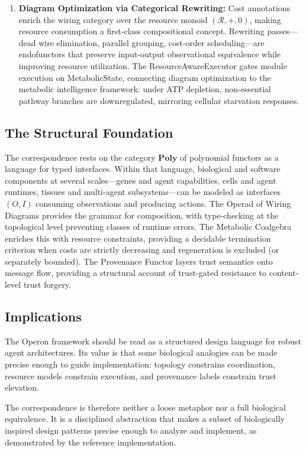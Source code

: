 \begin{enumerate}[leftmargin=*]
\item \textbf{Diagram Optimization via Categorical Rewriting:} Cost annotations enrich the wiring category
over the resource monoid $(\mathcal{R}, +, 0)$, making resource consumption a first-class compositional concept.
Rewriting passes---dead wire elimination, parallel grouping, cost-order scheduling---are endofunctors
that preserve input-output observational equivalence while improving resource utilization. The ResourceAwareExecutor
gates module execution on MetabolicState, connecting diagram optimization to the metabolic intelligence
framework: under ATP depletion, non-essential pathway branches are downregulated, mirroring cellular
starvation responses.
\end{enumerate}

\subsection*{The Structural Foundation}

The correspondence rests on the category $\mathbf{Poly}$ of polynomial functors as a language for typed
interfaces. Within that language, biological and software components at several scales---genes and agent
capabilities, cells and agent runtimes, tissues and multi-agent subsystems---can be modeled as interfaces
$(O, I)$ consuming observations and producing actions. The Operad of Wiring Diagrams
provides the grammar for composition, with type-checking at the topological level preventing classes of
runtime errors. The Metabolic Coalgebra enriches this with resource constraints, providing a decidable
termination criterion when costs are strictly decreasing and regeneration is excluded (or separately bounded).
The Provenance Functor layers trust semantics onto message flow, providing a structural account of
trust-gated resistance to content-level trust forgery.

\subsection*{Implications}

The Operon framework should be read as a structured design language for robust agent architectures. Its
value is that some biological analogies can be made precise enough to guide implementation: topology
constrains coordination, resource models constrain execution, and provenance labels constrain trust
elevation.

The correspondence is therefore neither a loose metaphor nor a full biological equivalence. It is a
disciplined abstraction that makes a subset of biologically inspired design patterns precise enough to
analyze and implement, as demonstrated by the reference implementation.

